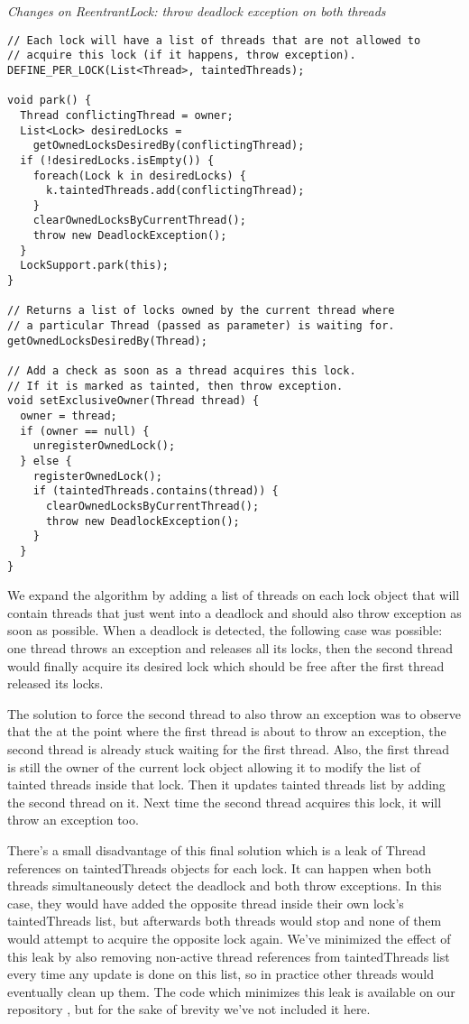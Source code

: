 \medskip
\noindent
{\it Changes on ReentrantLock: throw deadlock exception on both threads}
\begin{verbatim}
// Each lock will have a list of threads that are not allowed to
// acquire this lock (if it happens, throw exception).
DEFINE_PER_LOCK(List<Thread>, taintedThreads);

void park() {
  Thread conflictingThread = owner;
  List<Lock> desiredLocks =
    getOwnedLocksDesiredBy(conflictingThread);
  if (!desiredLocks.isEmpty()) {
    foreach(Lock k in desiredLocks) {
      k.taintedThreads.add(conflictingThread);
    }
    clearOwnedLocksByCurrentThread();
    throw new DeadlockException();
  }
  LockSupport.park(this);
}

// Returns a list of locks owned by the current thread where
// a particular Thread (passed as parameter) is waiting for.
getOwnedLocksDesiredBy(Thread);

// Add a check as soon as a thread acquires this lock.
// If it is marked as tainted, then throw exception.
void setExclusiveOwner(Thread thread) {
  owner = thread;
  if (owner == null) {
    unregisterOwnedLock();
  } else {
    registerOwnedLock();
    if (taintedThreads.contains(thread)) {
      clearOwnedLocksByCurrentThread();
      throw new DeadlockException();
    }
  }
}

\end{verbatim}

We expand the algorithm by adding a list of threads on each lock object that will contain threads that just went into a deadlock and should also throw exception as soon as possible.
When a deadlock is detected, the following case was possible: one thread throws an exception and releases all its locks, then the second thread would finally acquire its desired lock
which should be free after the first thread released its locks.

The solution to force the second thread to also throw an exception was to observe that the at the point where the first thread is about to throw an exception, the second thread
is already stuck waiting for the first thread. Also, the first thread is still the owner of the current lock object allowing it to modify the list of tainted threads inside that lock.
Then it updates tainted threads list by adding the second thread on it. Next time the second thread acquires this lock, it will throw an exception too.

There's a small disadvantage of this final solution which is a leak of Thread references on taintedThreads objects for each lock. It can happen when both threads
simultaneously detect the deadlock and both throw exceptions. In this case, they would have added the opposite thread inside their own lock's taintedThreads list, but afterwards
both threads would stop and none of them would attempt to acquire the opposite lock again. We've minimized the effect of this leak by also removing non-active thread
references from taintedThreads list every time any update is done on this list, so in practice other threads would eventually clean up them. The code which minimizes this
leak is available on our repository \cite{repo}, but for the sake of brevity we've not included it here.

